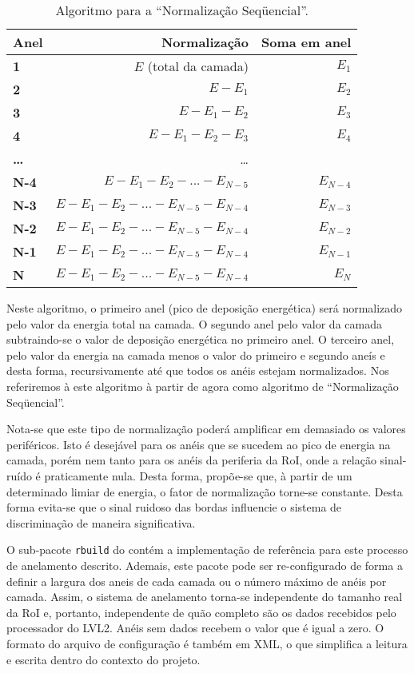 \begin{table}
\renewcommand{\baselinestretch}{1}
\begin{center}
\begin{tabular}{>{\bfseries}l r r}
Anel & Normalização & Soma em anel \\ \hline
1 & $E$ (total da camada) & $E_1$\\
2 & $E - E_1$ & $E_2$ \\
3 & $E - E_1 - E_2$ & $E_3$\\
4 & $E - E_1 - E_2 - E_3$ & $E_4$\\
\dots  & \dots \\
N-4 & $E - E_1 - E_2 - ... - E_{N-5}$ & $E_{N-4}$ \\
N-3 & $E - E_1 - E_2 - ... - E_{N-5} - E_{N-4}$ & $E_{N-3}$ \\
N-2 & $E - E_1 - E_2 - ... - E_{N-5} - E_{N-4}$ & $E_{N-2}$ \\
N-1 & $E - E_1 - E_2 - ... - E_{N-5} - E_{N-4}$ & $E_{N-1}$ \\
N & $E - E_1 - E_2 - ... - E_{N-5} - E_{N-4}$ & $E_N$ \\
\end{tabular}
\end{center}
\renewcommand{\baselinestretch}{1.5}
\caption{Algoritmo para a ``Normalização Seqüencial''.}
\label{tab:seq}
\end{table}

Neste algoritmo, o primeiro anel (pico de deposição energética) será
normalizado pelo valor da energia total na camada. O segundo anel pelo valor
da camada subtraindo-se o valor de deposição energética no primeiro anel. O
terceiro anel, pelo valor da energia na camada menos o valor do primeiro e
segundo aneís e desta forma, recursivamente até que todos os anéis estejam
normalizados. Nos referiremos à este algoritmo à partir de agora como
algoritmo de ``Normalização Seqüencial''.

Nota-se que este tipo de normalização poderá amplificar em demasiado os
valores periféricos. Isto é desejável para os anéis que se sucedem ao pico de
energia na camada, porém nem tanto para os anéis da periferia da RoI, onde a
relação sinal-ruído é praticamente nula. Desta forma, propõe-se que, à partir
de um determinado limiar de energia, o fator de normalização torne-se
constante. Desta forma evita-se que o sinal ruidoso das bordas influencie o
sistema de discriminação de maneira significativa.

O sub-pacote \texttt{rbuild} do  contém a implementação de
referência para este processo de anelamento descrito. Ademais, este pacote
pode ser re-configurado de forma a definir a largura dos aneis de cada camada
ou o número máximo de anéis por camada. Assim, o sistema de anelamento torna-se
independente do tamanho real da RoI e, portanto, independente de quão completo
são os dados recebidos pelo processador do LVL2. Anéis sem dados recebem o
valor  que é igual a zero. O formato do arquivo de configuração é
também em XML, o que simplifica a leitura e escrita dentro do contexto do
projeto.

